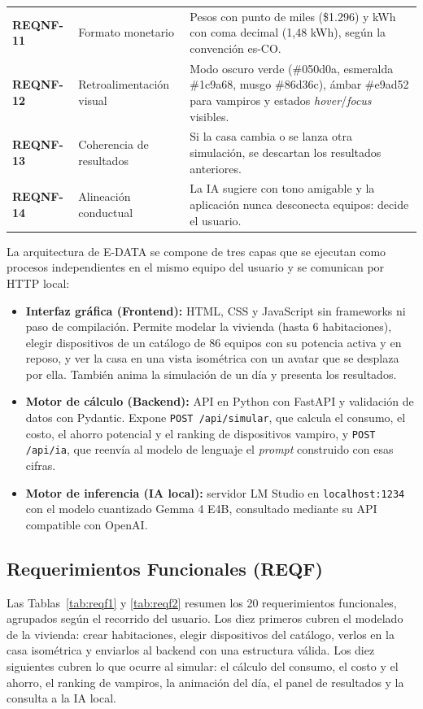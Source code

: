 \documentclass[10pt,journal,compsoc]{IEEEtran}
\begin{document}
\begin{table}[p]
\begin{tabularx}{\textwidth}{@{}l l X@{}}
\textbf{REQNF-11} & Formato monetario & Pesos con punto de miles (\$1.296) y kWh con coma decimal (1,48 kWh), según la convención es-CO. \\
\textbf{REQNF-12} & Retroalimentación visual & Modo oscuro verde (\#050d0a, esmeralda \#1c9a68, musgo \#86d36c), ámbar \#e9ad52 para vampiros y estados \emph{hover}/\emph{focus} visibles. \\
\textbf{REQNF-13} & Coherencia de resultados & Si la casa cambia o se lanza otra simulación, se descartan los resultados anteriores. \\
\textbf{REQNF-14} & Alineación conductual & La IA sugiere con tono amigable y la aplicación nunca desconecta equipos: decide el usuario. \\
\bottomrule
\end{tabularx}
\end{table}

La arquitectura de E-DATA se compone de tres capas que se ejecutan como procesos independientes en el mismo equipo del usuario y se comunican por HTTP local:

\begin{itemize}
\item \textbf{Interfaz gráfica (Frontend):} HTML, CSS y JavaScript sin frameworks ni paso de compilación. Permite modelar la vivienda (hasta 6 habitaciones), elegir dispositivos de un catálogo de 86 equipos con su potencia activa y en reposo, y ver la casa en una vista isométrica con un avatar que se desplaza por ella. También anima la simulación de un día y presenta los resultados.
\item \textbf{Motor de cálculo (Backend):} API en Python con FastAPI y validación de datos con Pydantic. Expone \texttt{POST /api/simular}, que calcula el consumo, el costo, el ahorro potencial y el ranking de dispositivos vampiro, y \texttt{POST /api/ia}, que reenvía al modelo de lenguaje el \emph{prompt} construido con esas cifras.
\item \textbf{Motor de inferencia (IA local):} servidor LM Studio en \texttt{localhost:1234} con el modelo cuantizado Gemma 4 E4B, consultado mediante su API compatible con OpenAI.
\end{itemize}

\subsection{Requerimientos Funcionales (REQF)}
Las Tablas~\ref{tab:reqf1} y \ref{tab:reqf2} resumen los 20 requerimientos funcionales, agrupados según el recorrido del usuario. Los diez primeros cubren el modelado de la vivienda: crear habitaciones, elegir dispositivos del catálogo, verlos en la casa isométrica y enviarlos al backend con una estructura válida. Los diez siguientes cubren lo que ocurre al simular: el cálculo del consumo, el costo y el ahorro, el ranking de vampiros, la animación del día, el panel de resultados y la consulta a la IA local.
\end{document}
